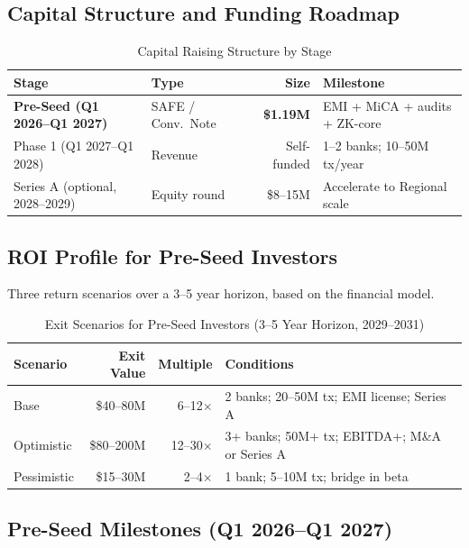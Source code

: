 \documentclass[11pt,a4paper]{article}
\begin{document}
\subsection*{Capital Structure and Funding Roadmap}

\begin{table}[htbp]
\centering
\caption{Capital Raising Structure by Stage}
\begin{tabularx}{\linewidth}{@{}lXrX@{}}
\toprule
\textbf{Stage} & \textbf{Type} & \textbf{Size} & \textbf{Milestone} \\
\midrule
\textbf{Pre-Seed (Q1 2026--Q1 2027)} & SAFE / Conv.\ Note & \textbf{\$1.19M} & EMI + MiCA + audits + ZK-core \\
Phase 1 (Q1 2027--Q1 2028)      & Revenue            & Self-funded      & 1--2 banks; 10--50M tx/year \\
Series A (optional, 2028--2029)  & Equity round       & \$8--15M         & Accelerate to Regional scale \\
\bottomrule
\end{tabularx}
\end{table}

\subsection*{ROI Profile for Pre-Seed Investors}

Three return scenarios over a 3--5 year horizon, based on the financial model.

\begin{table}[htbp]
\centering
\caption{Exit Scenarios for Pre-Seed Investors (3--5 Year Horizon, 2029--2031)}
\begin{tabularx}{\linewidth}{@{}lRRX@{}}
\toprule
\textbf{Scenario} & \textbf{Exit Value} & \textbf{Multiple} & \textbf{Conditions} \\
\midrule
Base          & \$40--80M   & 6--12$\times$  & 2 banks; 20--50M tx; EMI license; Series A \\
Optimistic    & \$80--200M  & 12--30$\times$ & 3+ banks; 50M+ tx; EBITDA+; M\&A or Series A~\cite{pitchbook} \\
Pessimistic   & \$15--30M   & 2--4$\times$   & 1 bank; 5--10M tx; bridge in beta \\
\bottomrule
\end{tabularx}
\end{table}

\subsection*{Pre-Seed Milestones (Q1 2026--Q1 2027)}
\end{document}
